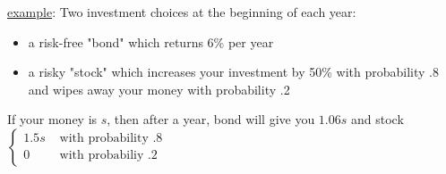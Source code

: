   \underline{example}: Two investment choices at the beginning of each year:
    \begin{itemize}
      \item a risk-free "bond" which returns 6\% per year
      \item a risky "stock" which increases your investment by 50\% with
        probability .8 and wipes away your money with probability .2
    \end{itemize}
    If your money is $s$, then after a year, bond will give you $1.06s$
    and stock $\begin{cases} 1.5s & \text{ with probability .8}\\
    0 & \text{ with probabiliy .2}\end{cases}$
